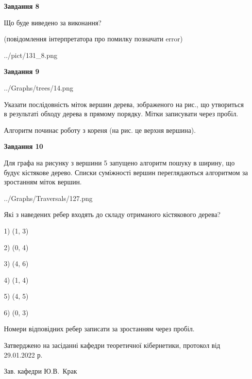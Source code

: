 \documentclass[12pt, ukrainian]{article}
\begin{document}
{\begin {large}
{\begin {center}\textbf{Завдання 8}\end {center}}\par
Що буде виведено за виконання?\par
 (повідомлення інтерпретатора про помилку позначати error)\par
\begin{center}
	{../pict/131_8.png}
\end{center}
\newpage

{\begin {center}\textbf{Завдання 9}\end {center}}\par

\begin{center}
	{../Graphs/trees/14.png}
\end{center}
Указати послідовність міток вершин дерева, зображеного на рис., що утвориться в результаті обходу дерева в прямому порядку. Мітки записувати через пробіл.\par Алгоритм починає роботу з кореня (на рис. це верхня вершина).\par
\newpage

{\begin {center}\textbf{Завдання 10}\end {center}}\par
Для графа на рисунку з вершини 5 запущено алгоритм пошуку в ширину, що будує кістякове дерево. Списки суміжності вершин переглядаються алгоритмом за зростанням міток вершин.\par
\begin{center}
	{../Graphs/Traversals/127.png}
\end{center}
\par Які з наведених ребер входять до складу отриманого кістякового дерева?\par
1) (1, 3)\par
2) (0, 4)\par
3) (4, 6)\par
4) (1, 4)\par
5) (4, 5)\par
6) (0, 3)\par
{\vskip 15pt} Номери відповідних ребер записати за зростанням через пробіл.\par
\newpage


\end {large}
}
{\smallskip \begin {small} Затверджено на засіданні кафедри теоретичної кібернетики, протокол  від   29.01.2022 р.\par\smallskip\smallskip
{\parbox {6.5 cm}{Зав. кафедри \dotfill Ю.В.~Крак}} \end{small}}
\end{document}
